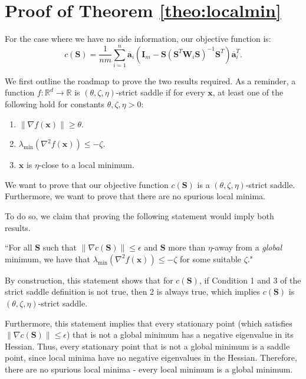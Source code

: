 \documentclass[twoside,11pt]{article}
\newcommand{\md}[1]{\mathbb{#1}}
\begin{document}
\setcounter{table}{0}
\renewcommand{\thetable}{A\arabic{table}}
\setcounter{figure}{0}
\renewcommand{\thefigure}{A\arabic{figure}}
\setcounter{equation}{0}
\renewcommand{\theequation}{A\arabic{equation}}
\section{Proof of Theorem \ref{theo:localmin}}
\label{app:localminproof}
For the case where we have no side information, our objective function is:
\[c(\bm{S})= \frac{1}{nm}\sum_{i=1}^n  \overline{\bm{a}}_i
\left(\bm{I}_m-\bm{S}\left(\bm{S}^T\bm{W}_i\bm{S}\right)^{-1}\bm{S}^T\right)\overline{\bm{a}}_i^T.\]

We  first outline the roadmap to prove the two results required. As a reminder, a function $f: \md{R}^d \to \md{R}$  is $(\theta, \zeta, \eta)$-strict saddle if for every $\bm{x}$, at least one of the following hold for constants $\theta, \zeta, \eta>0$:
\begin{enumerate}
	\item $\|\nabla f(\bm{x})\|\geq \theta$.
	\item $\lambda_{\text{min}}(\nabla^2f(\bm{x}))\leq -\zeta$.
	\item $\bm{x}$ is $\eta$-close to a local minimum.
\end{enumerate}
We want to prove that our objective function $c(\bm{S})$ is a $(\theta, \zeta, \eta)$-strict saddle. Furthermore, we want to prove that there are no spurious local minima. %

To do so, we  claim that proving the following statement would imply both results.

``For all $\bm{S}$ such that $\|\nabla c(\bm{S})\|\leq \epsilon$ and $\bm{S}$ more than $\eta$-away from a \emph{global} minimum, we have that $\lambda_{\text{min}}(\nabla^2f(\bm{x}))\leq -\zeta$ for some suitable $\zeta$."

By construction, this statement shows that for $c(\bm{S})$, if Condition 1 and 3 of the strict saddle definition is not true, then 2 is always true, which implies $c(\bm{S})$ is $(\theta, \zeta, \eta)$-strict saddle. 

Furthermore, this statement implies that every stationary point (which satisfies $\|\nabla c(\bm{S})\|\leq \epsilon$) that is not a global minimum has a negative eigenvalue in its Hessian. Thus, every stationary point that is not a global minimum is a saddle point, since local minima have no negative eigenvalues in the Hessian. Therefore, there are no spurious local minima - every local minimum is a global minimum. 
\end{document}
